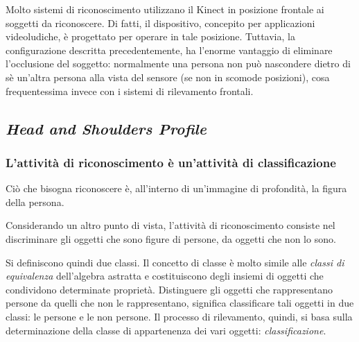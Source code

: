                 Molto sistemi di riconoscimento utilizzano il Kinect in posizione frontale ai soggetti da riconoscere.
                Di fatti, il dispositivo, concepito per applicazioni videoludiche, è progettato per operare in tale posizione.
                Tuttavia, la configurazione descritta precedentemente, ha l'enorme vantaggio di eliminare l'occlusione del soggetto: normalmente una persona non può nascondere dietro di sè un'altra persona alla vista del sensore (se non in scomode posizioni), cosa frequentessima invece con i sistemi di rilevamento frontali.

        \subsection{\emph{Head and Shoulders Profile}}
        \label{sub:hasp}
            \subsubsection{L'attività di riconoscimento è un'attività di classificazione}
                Ciò che bisogna riconoscere è, all'interno di un'immagine di profondità, la figura della persona.

                Considerando un altro punto di vista, l'attività di riconoscimento consiste nel discriminare gli oggetti che sono figure di persone, da oggetti che non lo sono.

                Si definiscono quindi due classi. Il concetto di classe è molto simile alle \emph{classi di equivalenza} dell'algebra astratta e costituiscono degli insiemi di oggetti che condividono determinate proprietà.
                Distinguere gli oggetti che rappresentano persone da quelli che non le rappresentano, significa classificare tali oggetti in due classi: le persone e le non persone.
                Il processo di rilevamento, quindi, si basa sulla determinazione della classe di appartenenza dei vari oggetti: \emph{classificazione}.

